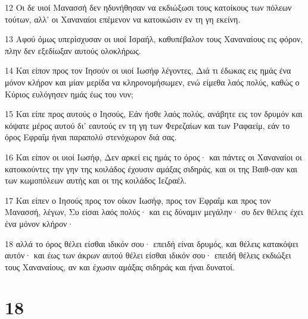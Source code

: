 \par 12 Οι δε υιοί Μανασσή δεν ηδυνήθησαν να εκδιώξωσι τους κατοίκους των πόλεων τούτων, αλλ' οι Χαναναίοι επέμενον να κατοικώσιν εν τη γη εκείνη.
\par 13 Αφού όμως υπερίσχυσαν οι υιοί Ισραήλ, καθυπέβαλον τους Χαναναίους εις φόρον, πλην δεν εξεδίωξαν αυτούς ολοκλήρως.
\par 14 Και είπον προς τον Ιησούν οι υιοί Ιωσήφ λέγοντες, Διά τι έδωκας εις ημάς ένα μόνον κλήρον και μίαν μερίδα να κληρονομήσωμεν, ενώ είμεθα λαός πολύς, καθώς ο Κύριος ευλόγησεν ημάς έως του νυν;
\par 15 Και είπε προς αυτούς ο Ιησούς, Εάν ήσθε λαός πολύς, ανάβητε εις τον δρυμόν και κόψατε μέρος αυτού δι' εαυτούς εν τη γη των Φερεζαίων και των Ραφαείμ, εάν το όρος Εφραΐμ ήναι παραπολύ στενόχωρον διά σας.
\par 16 Και είπον οι υιοί Ιωσήφ, Δεν αρκεί εις ημάς το όρος· και πάντες οι Χαναναίοι οι κατοικούντες την γην της κοιλάδος έχουσιν αμάξας σιδηράς, και οι της Βαιθ-σαν και των κωμοπόλεων αυτής και οι της κοιλάδος Ιεζραέλ.
\par 17 Και είπεν ο Ιησούς προς τον οίκον Ιωσήφ, προς τον Εφραΐμ και προς τον Μανασσή, λέγων, Συ είσαι λαός πολύς· και εις δύναμιν μεγάλην· συ δεν θέλεις έχει ένα μόνον κλήρον·
\par 18 αλλά το όρος θέλει είσθαι ιδικόν σου· επειδή είναι δρυμός, και θέλεις κατακόψει αυτόν· και έως των άκρων αυτού θέλει είσθαι ιδικόν σου· επειδή θέλεις εκδιώξει τους Χαναναίους, αν και έχωσιν αμάξας σιδηράς και ήναι δυνατοί.

\chapter{18}


